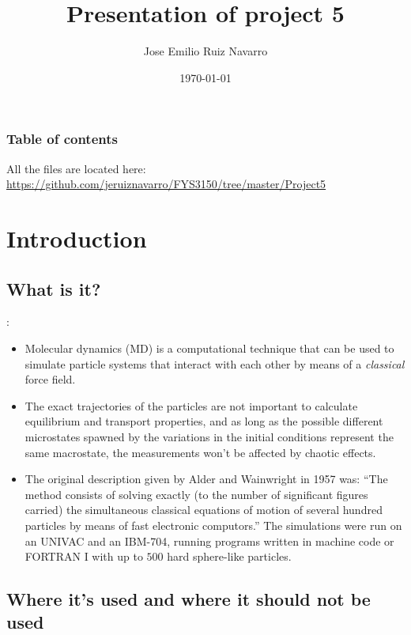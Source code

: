 \documentclass{beamer}
\title{\textbf{\Huge Presentation of project 5}}
\author{Jose Emilio Ruiz Navarro}
\date{\today}
\institute{University of Oslo}
\begin{document}
	
	\frame{\titlepage}
	
	\begin{frame}
		\frametitle{Table of contents}
		\tableofcontents
		All the files are located here: \url{https://github.com/jeruiznavarro/FYS3150/tree/master/Project5}
	\end{frame}
	
	\section{Introduction}
	
		\subsection{What is it?}

			\begin{frame}{\secname : \subsecname}
				\begin{itemize}
					\item Molecular dynamics (MD) is a computational technique that can be used to simulate particle systems that interact with each other by means of a \textit{classical} force field.
					\item The exact trajectories of the particles are not important to calculate equilibrium and transport properties, and as long as the possible different microstates spawned by the variations in the initial conditions represent the same macrostate, the measurements won't be affected by chaotic effects.
					\item The original description given by Alder and Wainwright in 1957 was: ``The method consists of solving exactly (to the number of significant figures carried) the simultaneous classical equations of motion of several hundred particles by means of fast electronic computors.''\cite{alder} The simulations were run on an UNIVAC and an IBM-704, running programs written in machine code or FORTRAN I with up to $500$ hard sphere-like particles.
				\end{itemize}
			\end{frame}
			
		\subsection{Where it's used and where it should not be used}
		
\end{document}

